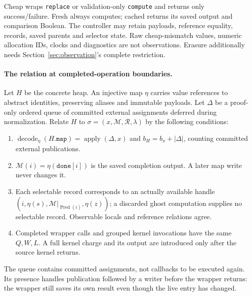 \documentclass[acmsmall,screen,review,anonymous]{acmart}
\begin{document}
Cheap wraps \texttt{replace} or validation-only \texttt{compute} and returns only success/failure. Fresh always computes; cached returns its saved output and comparison Boolean. The controller may retain payloads, reference equality, records, saved parents and selector state. Raw cheap-mismatch values, numeric allocation IDs, clocks and diagnostics are not observations. Erasure additionally needs Section~\ref{sec:observation}'s complete restriction.

\paragraph{The relation at completed-operation boundaries.}
Let $H$ be the concrete heap. An injective map $\eta$ carries value references to abstract identities, preserving aliases and immutable payloads. Let $\Delta$ be a proof-only ordered queue of committed external assignments deferred during normalization. Relate $H$ to $\sigma=(x,\mathcal M,\mathcal R,\lambda)$ by the following conditions:
\begin{enumerate}
\setlength{\itemsep}{0pt}
\item $\operatorname{decode}_{\eta}(H.\mathtt{map})=\operatorname{apply}(\Delta,x)$ and $b_H=b_x+|\Delta|$, counting committed external publications.
\item $\mathcal M(i)=\eta(\mathtt{done}[i])$ is the saved completion output. A later map write never changes it.
\item Each selectable record corresponds to an actually available handle $(i,\eta(s),\mathcal M|_{\operatorname{Pred}(i)},\eta(z))$; a discarded ghost computation supplies no selectable record. Observable locals and reference relations agree.
\item Completed wrapper calls and grouped kernel invocations have the same $Q,W,L$. A full kernel charge and its output are introduced only after the source kernel returns.
\end{enumerate}
The queue contains committed assignments, not callbacks to be executed again. Its presence handles publication followed by a writer before the wrapper returns: the wrapper still saves its own result even though the live entry has changed.
\end{document}
